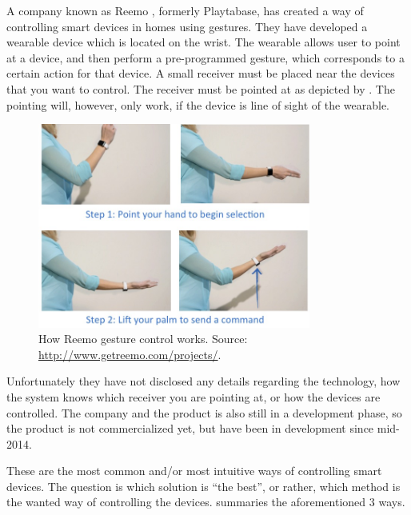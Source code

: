 A company known as Reemo \cite{Reemo}, formerly Playtabase, 
has created a way of controlling smart devices in homes using gestures. 
They have developed a wearable device which is located on the wrist. 
The wearable allows user to point at a device, 
and then perform a pre-programmed gesture, 
which corresponds to a certain action for that device. 
A small receiver must be placed near the devices that you want to control. 
The receiver must be pointed at as depicted by .
The pointing will, however, only work, 
if the device is line of sight of the wearable. 

\begin{figure}[!htb]
    \centering
    \includegraphics[width=0.8\textwidth]{images/Reemo}
    \caption{How Reemo gesture control works. Source: \url{http://www.getreemo.com/projects/}.}
    \label{fig:reemo}
\end{figure}

Unfortunately they have not disclosed any details regarding the technology, 
how the system knows which receiver you are pointing at, 
or how the devices are controlled. 
The company and the product is also still in a development phase, 
so the product is not commercialized yet, 
but have been in development since mid-2014.

These are the most common and/or most intuitive ways of controlling smart devices. 
The question is which solution is ``the best'', 
or rather, which method is the wanted way of controlling the devices.
 summaries the aforementioned 3 ways. 


